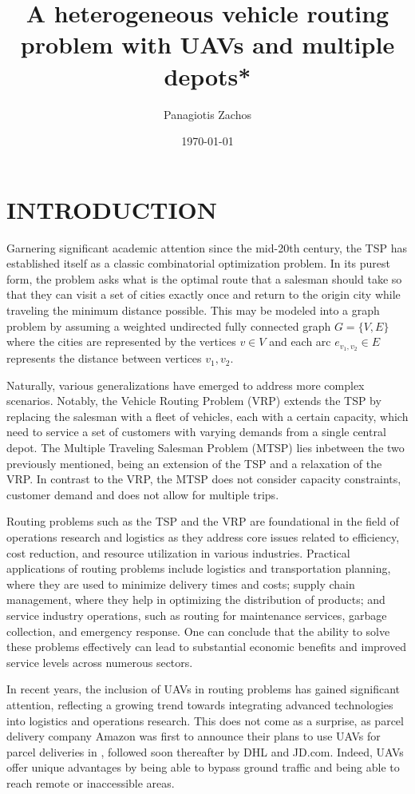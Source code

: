 \documentclass{article}
\title{A heterogeneous vehicle routing problem with UAVs and multiple depots*}
\author{Panagiotis Zachos}
\date{\today}
\begin{document}
	\maketitle
	\section{INTRODUCTION}
	Garnering significant academic attention since the mid-20th century, the TSP has established itself as a classic combinatorial optimization problem. In its purest form, the problem asks what is the optimal route that a salesman should take so that they can visit a set of cities exactly once and return to the origin city while traveling the minimum distance possible. This may be modeled into a graph problem by assuming a weighted undirected fully connected graph $G=\{V,E\}$ where the cities are represented by the vertices $v\in V$ and each arc $e_{v_1,v_2}\in E$ represents the distance between vertices $v_1,v_2$.
	\par
	Naturally, various generalizations have emerged to address more complex scenarios. Notably, the Vehicle Routing Problem (VRP) extends the TSP by replacing the salesman with a fleet of vehicles, each with a certain capacity, which need to service a set of customers with varying demands from a single central depot. The Multiple Traveling Salesman Problem (MTSP) lies inbetween the two previously mentioned, being an extension of the TSP and a relaxation of the VRP. In contrast to the VRP, the MTSP does not consider capacity constraints, customer demand and does not allow for multiple trips.
	\par 
	Routing problems such as the TSP and the VRP are foundational in the field of operations research and logistics as they address core issues related to efficiency, cost reduction, and resource utilization in various industries.
	Practical applications of routing problems include logistics and transportation planning, where they are used to minimize delivery times and costs; supply chain management, where they help in optimizing the distribution of products; and service industry operations, such as routing for maintenance services, garbage collection, and emergency response. One can conclude that the ability to solve these problems effectively can lead to substantial economic benefits and improved service levels across numerous sectors.
	\par 
	In recent years, the inclusion of UAVs in routing problems has gained significant attention, reflecting a growing trend towards integrating advanced technologies into logistics and operations research. This does not come as a surprise, as parcel delivery company Amazon \cite{rose2013} was first to announce their plans to use UAVs for parcel deliveries in \citeyear{rose2013}, followed soon thereafter by DHL and JD.com. Indeed, UAVs offer unique advantages by being able to bypass ground traffic and being able to reach remote or inaccessible areas.
\end{document}
